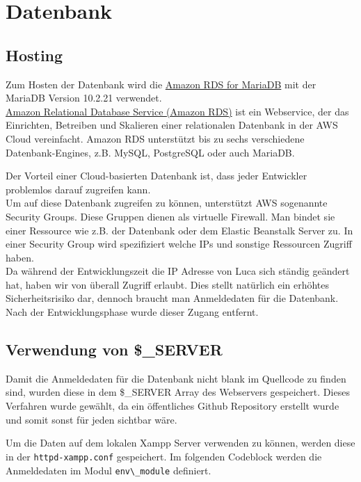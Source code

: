 \chapter{Datenbank}

\section{Hosting}
Zum Hosten der Datenbank wird die \href{https://aws.amazon.com/de/rds/mariadb/}{Amazon RDS for MariaDB} mit der MariaDB Version 10.2.21 verwendet. \\
\glqq\href{https://aws.amazon.com/de/rds/}{Amazon Relational Database Service (Amazon RDS)} ist ein Webservice, der das Einrichten, Betreiben und Skalieren einer relationalen Datenbank in der AWS Cloud vereinfacht.\grqq \cite{AmazonRDS} Amazon RDS unterstützt bis zu sechs verschiedene Datenbank-Engines, z.B. MySQL, PostgreSQL oder auch MariaDB. \cite{AmazonRDS}

Der Vorteil einer Cloud-basierten Datenbank ist, dass jeder Entwickler problemlos darauf zugreifen kann.\\
Um auf diese Datenbank zugreifen zu können, unterstützt AWS sogenannte Security Groups. Diese Gruppen dienen als virtuelle Firewall. Man bindet sie einer Ressource wie z.B. der Datenbank oder dem Elastic Beanstalk Server zu. In einer Security Group wird spezifiziert welche IPs und sonstige Ressourcen Zugriff haben.\\
Da während der Entwicklungszeit die IP Adresse von Luca sich ständig geändert hat, haben wir von überall Zugriff erlaubt. Dies stellt natürlich ein erhöhtes Sicherheitsrisiko dar, dennoch braucht man Anmeldedaten für die Datenbank. Nach der Entwicklungsphase wurde dieser Zugang entfernt.

\section{Verwendung von \$\_SERVER}
Damit die Anmeldedaten für die Datenbank nicht blank im Quellcode zu finden sind, wurden diese in dem \$\_SERVER Array des Webservers gespeichert. Dieses Verfahren wurde gewählt, da ein öffentliches Github Repository erstellt wurde und somit sonst für jeden sichtbar wäre.

Um die Daten auf dem lokalen Xampp Server verwenden zu können, werden diese in der \lstinline{httpd-xampp.conf} gespeichert. Im folgenden Codeblock werden die Anmeldedaten im Modul \lstinline{env\_module} definiert.


